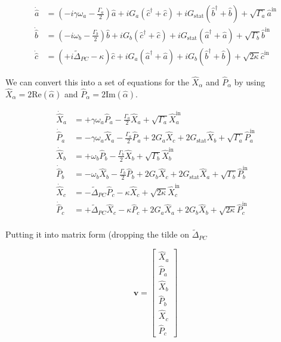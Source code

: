 \documentclass[12pt]{article}
\begin{document}
\begin{align}
\dot{\hat{a}} &= \left(-i \gamma \omega_a-\frac{\Gamma_a}{2}\right)\hat{a} + i G_a (\hat{c}^{\dag}+\hat{c}) + i G_{\text{stat}}(\hat{b}^{\dag}+\hat{b}) + \sqrt{\Gamma_a}\hat{a}^{\text{in}}\\
\dot{\hat{b}} &= \left(-i \omega_b - \frac{\Gamma_b}{2}\right)\hat{b} +i G_b(\hat{c}^{\dag}+\hat{c}) + iG_{\text{stat}}(\hat{a}^{\dag}+\hat{a}) + \sqrt{\Gamma_b}\hat{b}^{\text{in}}\\
\dot{\hat{c}} &= \left(+i \tilde{\Delta}_{PC} -\kappa\right)\hat{c} +iG_a (\hat{a}^{\dag}+\hat{a})+i G_b (\hat{b}^{\dag} + \hat{b}) + \sqrt{2\kappa}\hat{c}^{\text{in}}
\end{align}

We can convert this into a set of equations for the $\hat{X}_{\alpha}$ and $\hat{P}_{\alpha}$ by using $\hat{X}_{\alpha} = 2 \text{Re}(\hat{\alpha})$ and $\hat{P}_{\alpha} = 2 \text{Im}(\hat{\alpha})$.

\begin{align*}
\dot{\hat{X}}_a &= +\gamma \omega_a \hat{P}_a -\frac{\Gamma_a}{2} \hat{X}_a + \sqrt{\Gamma_a}\hat{X}_a^{\text{in}}\\
\dot{\hat{P}}_a &= -\gamma \omega_a \hat{X}_a -\frac{\Gamma_a}{2} \hat{P}_a + 2 G_a \hat{X}_c + 2G_{\text{stat}}\hat{X}_b + \sqrt{\Gamma_a}\hat{P}_a^{\text{in}}\\
\dot{\hat{X}}_b &= +\omega_b \hat{P}_b -\frac{\Gamma_b}{2} \hat{X}_b + \sqrt{\Gamma_b}\hat{X}_b^{\text{in}}\\
\dot{\hat{P}}_b &= -\omega_b \hat{X}_b -\frac{\Gamma_b}{2} \hat{P}_b + 2 G_b \hat{X}_c + 2G_{\text{stat}}\hat{X}_a + \sqrt{\Gamma_b}\hat{P}_b^{\text{in}}\\
\dot{\hat{X}}_c &= -\tilde{\Delta}_{PC} \hat{P}_c - \kappa \hat{X}_c + \sqrt{2\kappa}\hat{X}_c^{\text{in}}\\
\dot{\hat{P}}_c &= +\tilde{\Delta}_{PC} \hat{X}_c - \kappa \hat{P}_c + 2 G_a \hat{X}_a + 2 G_b \hat{X}_b + \sqrt{2\kappa}\hat{P}_c^{\text{in}}\\
\end{align*}

Putting it into matrix form (dropping the tilde on $\tilde{\Delta}_{PC}$

\[ \textbf{v} = \begin{bmatrix}
\hat{X}_a\\\hat{P}_a\\\hat{X}_b\\\hat{P}_b\\\hat{X}_c\\\hat{P}_c \end{bmatrix} \]
\end{document}

